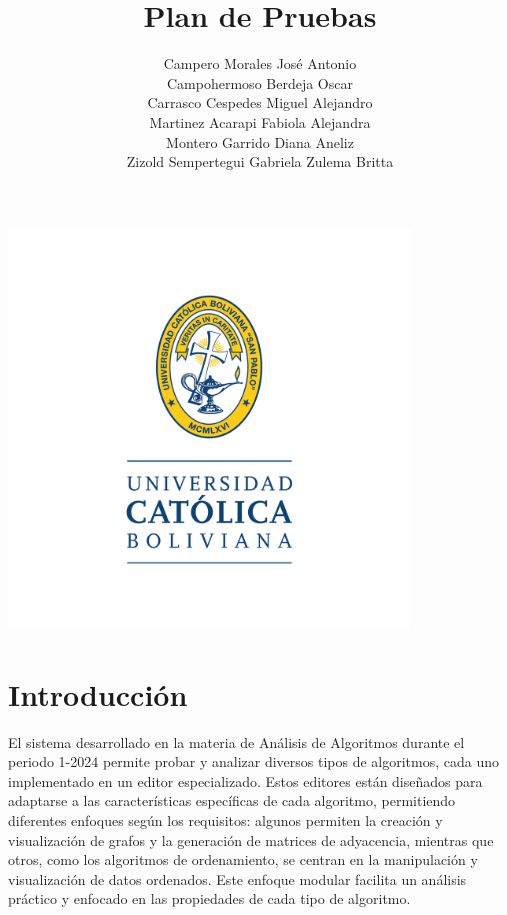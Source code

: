 \documentclass[stu, 12pt, letterpaper, donotrepeattitle, floatsintext, natbib]{apa7}
\title{\Large Plan de Pruebas}
\author{
    Campero Morales José Antonio \\
    Campohermoso Berdeja Oscar \\
    Carrasco Cespedes Miguel Alejandro \\
    Martinez Acarapi Fabiola Alejandra \\
    Montero Garrido Diana Aneliz \\
    Zizold Sempertegui Gabriela Zulema Britta
}
\affiliation{Universidad Católica Boliviana}
\begin{document}
\thispagestyle{empty}

\centering
\includegraphics[width=0.8\textwidth]{../imgs/logo-ucb.png} %
\vspace{-5cm} %

\maketitle

\newpage
{}
\renewcommand\contentsname{\large Índice}
\tableofcontents
\setcounter{tocdepth}{2}
\newpage
\renewcommand{\listfigurename}{\large Índice de figuras}
\listoffigures
\newpage
\renewcommand{\listtablename}{\large Índice de tablas}
\listoftables
\newpage

\section{\large Introducción}

\noindent El sistema desarrollado en la materia de Análisis de Algoritmos durante el periodo 1-2024 permite probar y analizar diversos tipos de algoritmos, cada uno implementado en un editor especializado. Estos editores están diseñados para adaptarse a las características específicas de cada algoritmo, permitiendo diferentes enfoques según los requisitos: algunos permiten la creación y visualización de grafos y la generación de matrices de adyacencia, mientras que otros, como los algoritmos de ordenamiento, se centran en la manipulación y visualización de datos ordenados. Este enfoque modular facilita un análisis práctico y enfocado en las propiedades de cada tipo de algoritmo.
\end{document}
